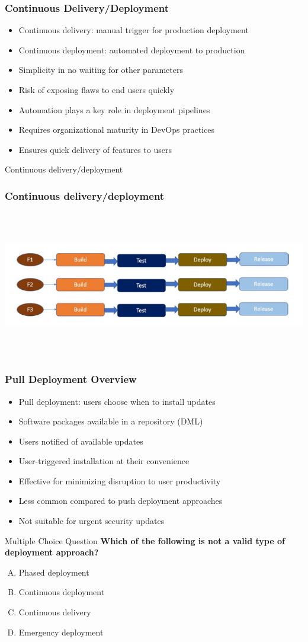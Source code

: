 \documentclass[aspectratio=169, table]{beamer}
\begin{document}
\begin{frame}
	\frametitle{Continuous Delivery/Deployment}
	\begin{itemize}
		\item Continuous delivery: manual trigger for production deployment
		\item Continuous deployment: automated deployment to production
		\item Simplicity in no waiting for other parameters
		\item Risk of exposing flaws to end users quickly
		\item Automation plays a key role in deployment pipelines
		\item Requires organizational maturity in DevOps practices
		\item Ensures quick delivery of features to users
	\end{itemize}
\end{frame}

\begin{frame}{Continuous delivery/deployment} 	 \frametitle{Continuous delivery/deployment} \begin{center} 	\includegraphics[width=0.8\linewidth]{images/image-06.png} \end{center} \end{frame}

\begin{frame}
	\frametitle{Pull Deployment Overview}
	\begin{itemize}
		\item Pull deployment: users choose when to install updates
		\item Software packages available in a repository (DML)
		\item Users notified of available updates
		\item User-triggered installation at their convenience
		\item Effective for minimizing disruption to user productivity
		\item Less common compared to push deployment approaches
		\item Not suitable for urgent security updates
	\end{itemize}
\end{frame}

\begin{frame}{Multiple Choice Question}
\textbf{Which of the following is not a valid type of deployment approach?}

\begin{enumerate}[A.]
	\item Phased deployment
	\item Continuous deployment
	\item Continuous delivery
	\item Emergency deployment
\end{enumerate}
\end{frame}
\end{document}
